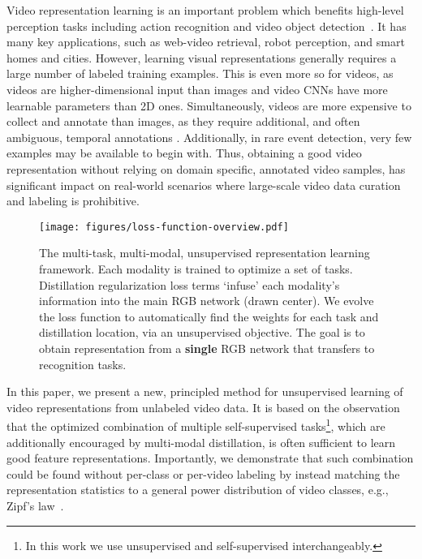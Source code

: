 \documentclass[10pt,twocolumn,letterpaper]{article}
\begin{document}
Video representation learning is an important problem which benefits high-level perception tasks including action recognition and video object detection~\cite{tran2014c3d,carreira2017quo,tran2018closer}. It has many key applications, such as web-video retrieval, robot perception, and smart homes and cities.
However, learning visual representations generally requires a large number of labeled training examples. This is even more so for videos, as videos are higher-dimensional input than images and video CNNs have more learnable parameters than 2D ones. Simultaneously, videos are more expensive to collect and annotate than images, as they require additional, and often ambiguous, temporal annotations \cite{whatactions}. Additionally, in rare event detection, very few examples may be available to begin with.
Thus, obtaining a good video representation without relying on domain specific, annotated video samples, has significant impact on real-world scenarios where large-scale video data curation and labeling is prohibitive.

\begin{figure*}
    \centering
    \texttt{[image: figures/loss-function-overview.pdf]}
    \caption{
    The multi-task, multi-modal, unsupervised representation learning framework. Each modality is trained to optimize a set of tasks. 
    Distillation regularization loss terms `infuse' each modality's information into the main RGB network (drawn center). We evolve the loss function to automatically find the weights for each task and distillation location, via an unsupervised objective. The goal is to obtain representation from a \textbf{single} RGB network that transfers to recognition tasks.}
    \label{fig:overview}
\end{figure*}


In this paper, we present a new, principled method for unsupervised learning of video representations from unlabeled video data. It is based on the observation that the optimized combination of multiple self-supervised tasks\footnote{In this work we use unsupervised and self-supervised interchangeably.}, which are additionally encouraged by multi-modal distillation, is often sufficient to learn good feature representations. Importantly, we demonstrate that such combination could be found without per-class or per-video labeling by instead matching the representation statistics to a general power distribution of video classes, e.g., Zipf's law~\cite{zipf1949human}.
\end{document}
